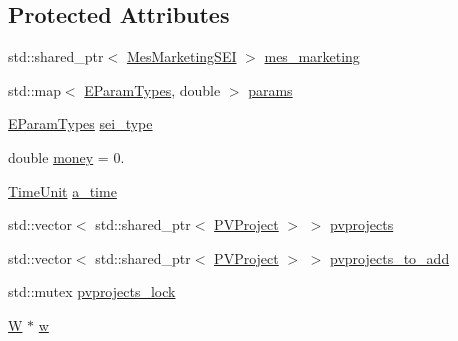 \subsection*{Protected Attributes}
{\bf }\par
\begin{DoxyCompactItemize}
\item 
std\+::shared\+\_\+ptr$<$ \hyperlink{classsolar__core_1_1_mes_marketing_s_e_i}{Mes\+Marketing\+S\+E\+I} $>$ \hyperlink{classsolar__core_1_1_s_e_i_ad5326c45ccd4a5512a6c0a296656264d}{mes\+\_\+marketing}
\end{DoxyCompactItemize}

{\bf }\par
\begin{DoxyCompactItemize}
\item 
std\+::map$<$ \hyperlink{namespacesolar__core_aa1147341e5ef7a40d68d1bd68e149362}{E\+Param\+Types}, double $>$ \hyperlink{classsolar__core_1_1_s_e_i_a811b998092171224983f9aefaa974707}{params}
\item 
\hyperlink{namespacesolar__core_aa1147341e5ef7a40d68d1bd68e149362}{E\+Param\+Types} \hyperlink{classsolar__core_1_1_s_e_i_a788ef7ae27cee8b9b99b57eba9ab2981}{sei\+\_\+type}
\item 
double \hyperlink{classsolar__core_1_1_s_e_i_a8ab5ab03ef726a3354b7c0e0d18da82a}{money} = 0.
\item 
\hyperlink{namespacesolar__core_a4b5949d07259da6f8a20d12a30403e90}{Time\+Unit} \hyperlink{classsolar__core_1_1_s_e_i_abf17b36abf722993d5ad53710579d402}{a\+\_\+time}
\end{DoxyCompactItemize}

{\bf }\par
\begin{DoxyCompactItemize}
\item 
std\+::vector$<$ std\+::shared\+\_\+ptr$<$ \hyperlink{classsolar__core_1_1_p_v_project}{P\+V\+Project} $>$ $>$ \hyperlink{classsolar__core_1_1_s_e_i_a76d9d151e51465d534ff0fd3d64f98bc}{pvprojects}
\item 
std\+::vector$<$ std\+::shared\+\_\+ptr$<$ \hyperlink{classsolar__core_1_1_p_v_project}{P\+V\+Project} $>$ $>$ \hyperlink{classsolar__core_1_1_s_e_i_a99fe003b8fd35b6ef44dec39ed374ffe}{pvprojects\+\_\+to\+\_\+add}
\item 
std\+::mutex \hyperlink{classsolar__core_1_1_s_e_i_adc031a01a6acf03d68b6d0037a2c8a30}{pvprojects\+\_\+lock}
\end{DoxyCompactItemize}

{\bf }\par
\begin{DoxyCompactItemize}
\item 
\hyperlink{classsolar__core_1_1_w}{W} $\ast$ \hyperlink{classsolar__core_1_1_s_e_i_a82e0c6b5f6d83639a08c1bc357fd3466}{w}
\end{DoxyCompactItemize}

